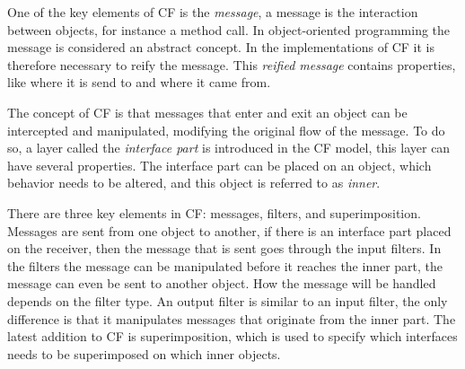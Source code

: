 One of the key elements of CF is the \emph{message}, a message is the interaction between objects, for instance a method call.
In object-oriented programming the message is considered an abstract concept. In the implementations of CF it is therefore necessary to reify the message.
This \emph{reified message} contains properties, like where it is send to and where it came from.

The concept of CF is that messages that enter and exit an object can be intercepted and manipulated, modifying the original flow of the message.
To do so, a layer called the \emph{interface part} is introduced in the CF model, this layer can have several properties.
The interface part can be placed on an object, which behavior needs to be altered, and this object is referred to as \emph{inner}.


There are three key elements in CF: messages, filters, and superimposition.
Messages are sent from one object to another, if there is an interface part placed on the receiver, then the message that is sent goes through the input filters.
In the filters the message can be manipulated before it reaches the inner part, the message can even be sent to another object.
How the message will be handled depends on the filter type.
An output filter is similar to an input filter, the only difference is that it manipulates messages that originate from the inner part.
The latest addition to CF is superimposition, which is used to specify which interfaces needs to be superimposed on which
inner objects.


